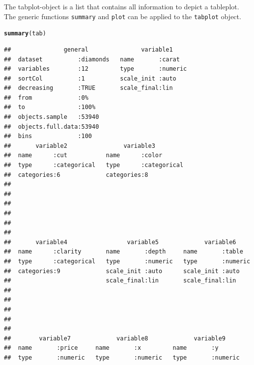 \documentclass[11pt, fleqn, a4paper]{article}\usepackage[]{graphicx}\usepackage[]{color}
\makeatletter
\newcommand{\hlstd}[1]{\textcolor[rgb]{0.345,0.345,0.345}{#1}}%
\newcommand{\hlkwd}[1]{\textcolor[rgb]{0.737,0.353,0.396}{\textbf{#1}}}%
\newenvironment{kframe}{%
 \def\at@end@of@kframe{}%
 \ifinner\ifhmode%
  \def\at@end@of@kframe{\end{minipage}}%
  \begin{minipage}{\columnwidth}%
 \fi\fi%
 \def\FrameCommand##1{\hskip\@totalleftmargin \hskip-\fboxsep
 \colorbox{shadecolor}{##1}\hskip-\fboxsep
     \hskip-\linewidth \hskip-\@totalleftmargin \hskip\columnwidth}%
 \MakeFramed {\advance\hsize-\width
   \@totalleftmargin\z@ \linewidth\hsize
   \@setminipage}}%
 {\par\unskip\endMakeFramed%
 \at@end@of@kframe}
\newenvironment{knitrout}{}{} %
\makeatother
\begin{document}
The tabplot-object is a list that contains all information to depict a tableplot. The generic functions {\tt summary} and {\tt plot} can be applied to the {\tt tabplot} object.

\begin{knitrout}\scriptsize
{}\color{fgcolor}\begin{kframe}
\begin{alltt}
\hlkwd{summary}\hlstd{(tab)}
\end{alltt}
\begin{verbatim}
##               general               variable1      
##  dataset          :diamonds   name       :carat    
##  variables        :12         type       :numeric  
##  sortCol          :1          scale_init :auto     
##  decreasing       :TRUE       scale_final:lin      
##  from             :0%                              
##  to               :100%                            
##  objects.sample   :53940                           
##  objects.full.data:53940                           
##  bins             :100                             
##       variable2                variable3          
##  name      :cut           name      :color        
##  type      :categorical   type      :categorical  
##  categories:6             categories:8            
##                                                   
##                                                   
##                                                   
##                                                   
##                                                   
##                                                   
##       variable4                 variable5             variable6      
##  name      :clarity       name       :depth     name       :table    
##  type      :categorical   type       :numeric   type       :numeric  
##  categories:9             scale_init :auto      scale_init :auto     
##                           scale_final:lin       scale_final:lin      
##                                                                      
##                                                                      
##                                                                      
##                                                                      
##                                                                      
##        variable7             variable8             variable9      
##  name       :price     name       :x         name       :y        
##  type       :numeric   type       :numeric   type       :numeric  

\end{verbatim}
\end{kframe}
\end{knitrout}
\end{document}
